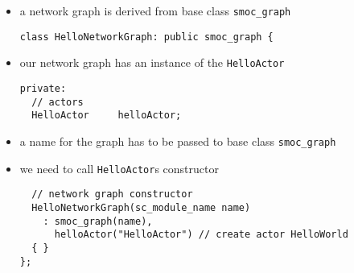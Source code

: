 \begin{frame}[fragile=singleslide]
\begin{itemize}
\item a network graph is derived from base class \lstinline!smoc_graph!
\begin{lstlisting}
class HelloNetworkGraph: public smoc_graph {
\end{lstlisting}
\item our network graph has an instance of the \lstinline!HelloActor!
\begin{lstlisting}
private:
  // actors
  HelloActor     helloActor;
\end{lstlisting}
\item a name for the graph has to be passed to base class \lstinline!smoc_graph!
\item we need to call \lstinline!HelloActor!s constructor
\begin{lstlisting}
  // network graph constructor
  HelloNetworkGraph(sc_module_name name)
    : smoc_graph(name),
      helloActor("HelloActor") // create actor HelloWorld
  { }
};
\end{lstlisting}
\end{itemize}
\end{frame}

